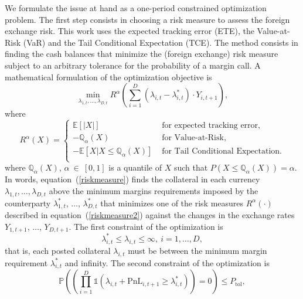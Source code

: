 We formulate the issue at hand as a one-period constrained optimization problem.
The first step consists in choosing a risk measure to assess the foreign exchange
risk. This work uses the expected tracking error (ETE), the Value-at-Risk (VaR) and
the Tail Conditional Expectation (TCE). The method consists in finding the cash
balances that minimize the (foreign exchange) risk measure subject to an arbitrary
tolerance for the probability of a margin call. A mathematical formulation of the
optimization objective is
\begin{equation}
\label{riskmeasure} \min_{\lambda_{1,t}, \ldots, \lambda_{D,t}}
R^{\alpha}\left( \sum_{i=1}^D \left( \lambda_{i,t} -
\lambda_{i,t}^{\ast} \right) \cdot Y_{i,t+1} \right),
\end{equation}
where
\begin{equation}
\label{riskmeasure2}
R^{\alpha}(X) = \left\{ \begin{array}{cl}
              \mathbb{E}\left[ \left| X\right| \right] & \mbox{ for expected tracking error}, \\
              -\mathbb{Q}_{\alpha}(X) & \mbox{ for Value-at-Risk}, \\
              -\mathbb{E}[X|X\leq \mathbb{Q}_{\alpha}(X)] & \mbox{ for Tail Conditional Expectation}. \\
       \end{array} \right.
\end{equation}
where $\mathbb{Q}_{\alpha}(X)$, $\alpha \ \in \ [0,1]$ is a  quantile of $X$
such that $P(X\leq\mathbb{Q}_{\alpha}(X))=\alpha$. In words,
equation~(\ref{riskmeasure}) finds the collateral in each
currency $\lambda_{1,t}, \ldots, \lambda_{D,t}$  above the minimum
margins requirements imposed by the counterparty
$\lambda_{1,t}^{\ast}$, $\ldots$, $\lambda_{D,t}^{\ast}$ that
minimizes one of the risk measures $R^{\alpha}(\cdot)$ described in
equation~(\ref{riskmeasure2}) against the changes in the exchange
rates $Y_{1,t+1}$, $\ldots$, $Y_{D,t+1}$.
The first constraint of the optimization is
\begin{displaymath}
\lambda_{i,t}^{\ast}\leq\lambda_{i,t}\leq\infty,\ i=1,\ldots,D,
\end{displaymath}
that is, each posted collateral $\lambda_{i,t}$ must be between the
minimum margin requirement $\lambda_{i,t}^{\ast}$ and infinity.  The
second constraint of the optimization is
\begin{displaymath}
\mathbb{P} \left( \left( \prod_{i=1}^D \mathds{1}\left(
\lambda_{i,t} + \mbox{PnL}_{i,t+1}\geq
\lambda_{i,t}^{\ast}\right)\right)=0 \right) \leq P_{\mbox{tol}},
\end{displaymath}
